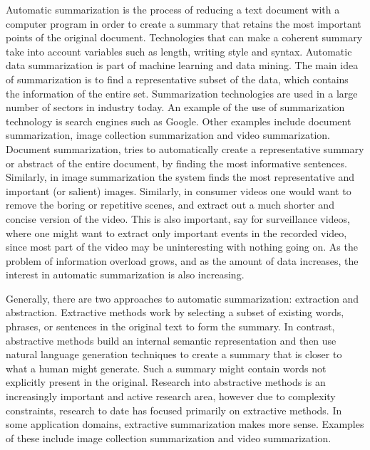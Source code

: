 \documentclass[12pt]{article}
\begin{document}
\maketitle

Automatic summarization is the process of reducing a text document with a computer program in order to create a summary that retains the most important points of the original document.
Technologies that can make a coherent summary take into account variables such as length, writing style and syntax.
Automatic data summarization is part of machine learning and data mining.
The main idea of summarization is to find a representative subset of the data, which contains the information of the entire set.
Summarization technologies are used in a large number of sectors in industry today.
An example of the use of summarization technology is search engines such as Google.
Other examples include document summarization, image collection summarization and video summarization.
Document summarization, tries to automatically create a representative summary or abstract of the entire document, by finding the most informative sentences.
Similarly, in image summarization the system finds the most representative and important (or salient) images.
Similarly, in consumer videos one would want to remove the boring or repetitive scenes, and extract out a much shorter and concise version of the video.
This is also important, say for surveillance videos, where one might want to extract only important events in the recorded video, since most part of the video may be uninteresting with nothing going on.
As the problem of information overload grows, and as the amount of data increases, the interest in automatic summarization is also increasing.

Generally, there are two approaches to automatic summarization: extraction and abstraction.
Extractive methods work by selecting a subset of existing words, phrases, or sentences in the original text to form the summary.
In contrast, abstractive methods build an internal semantic representation and then use natural language generation techniques to create a summary that is closer to what a human might generate.
Such a summary might contain words not explicitly present in the original.
Research into abstractive methods is an increasingly important and active research area, however due to complexity constraints, research to date has focused primarily on extractive methods.
In some application domains, extractive summarization makes more sense.
Examples of these include image collection summarization and video summarization.
\end{document}
